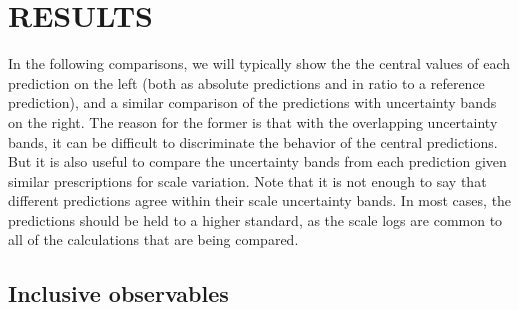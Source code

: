 \section{RESULTS}
\label{sec:hjetscomp:results}

In the following comparisons, we will typically show the the central
values of each prediction on the left (both as absolute predictions
and in ratio to a reference prediction), and a similar comparison of
the predictions with uncertainty bands on the right. The reason for
the former is that with the overlapping uncertainty bands, it can be
difficult to discriminate the behavior of the central predictions. But
it is also useful to compare the uncertainty bands from each
prediction given similar prescriptions for scale variation.  Note that
it is not enough to say that different predictions agree within their
scale uncertainty bands. In most cases, the predictions should be held
to a higher standard, as the scale logs are common to all of the
calculations that are being compared.







\subsection{Inclusive observables}
\label{sec:hjetscomp:results:inclobs}

